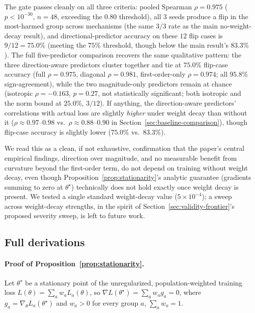\documentclass{article}
\newcommand{\theorig}{\theta^\star}
\begin{document}
The gate passes cleanly on all three criteria: pooled Spearman $\rho=0.975$ ($p<10^{-30}$, $n=48$, exceeding the $0.80$ threshold), all $3$ seeds produce a flip in the most-harmed group across mechanisms (the same $3/3$ rate as the main no-weight-decay result), and directional-predictor accuracy on these $12$ flip cases is $9/12=75.0\%$ (meeting the $75\%$ threshold, though below the main result's $83.3\%$). The full five-predictor comparison recovers the same qualitative pattern: the three direction-aware predictors cluster together and tie at $75.0\%$ flip-case accuracy (full $\rho=0.975$, diagonal $\rho=0.981$, first-order-only $\rho=0.974$; all $95.8\%$ sign-agreement), while the two magnitude-only predictors remain at chance (isotropic $\rho=-0.163$, $p=0.27$, not statistically significant; both isotropic and the norm bound at $25.0\%$, $3/12$). If anything, the direction-aware predictors' correlations with actual loss are slightly \emph{higher} under weight decay than without it ($\rho\approx0.97$--$0.98$ vs.\ $\rho\approx0.88$--$0.90$ in Section~\ref{sec:baseline-comparison}), though flip-case accuracy is slightly lower ($75.0\%$ vs.\ $83.3\%$).

We read this as a clean, if not exhaustive, confirmation that the paper's central empirical findings, direction over magnitude, and no measurable benefit from curvature beyond the first-order term, do not depend on training without weight decay, even though Proposition~\ref{prop:stationarity}'s analytic guarantee (gradients summing to zero at $\theorig$) technically does not hold exactly once weight decay is present. We tested a single standard weight-decay value ($5\times10^{-4}$); a sweep across weight-decay strengths, in the spirit of Section~\ref{sec:validity-frontier}'s proposed severity sweep, is left to future work.

\subsection{Full derivations}
\label{app:derivations}

\paragraph{Proof of Proposition~\ref{prop:stationarity}.}
Let $\theorig$ be a stationary point of the unregularized, population-weighted training loss $L(\theta) = \sum_a w_a L_a(\theta)$, so $\nabla L(\theorig) = \sum_a w_a g_a = 0$, where $g_a = \nabla_\theta L_a(\theorig)$ and $w_a > 0$ for every group $a$, $\sum_a w_a = 1$.
\end{document}
